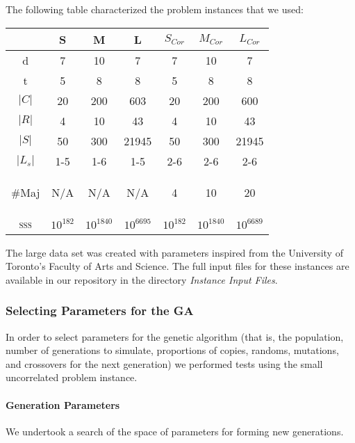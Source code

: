 \documentclass[letterpaper]{article}
\begin{document}
      The following table characterized the problem instances that we used:
      
      \begin{center}
      \begin{small}
      \begin{tabular}{*{7}{c}}
      \hline 
      	& S 	& M 	& L 	& $S_{Cor}$ & $M_{Cor}$ & $L_{Cor}$ \\ 
      \hline \hline
       d 		& 7 	& 10	& 7 	& 7 	& 10 	& 7 	\\ 
       t 		& 5		& 8 	& 8 	& 5 	& 8 	& 8 	\\ 
       $|C|$	& 20 	& 200 	& 603 	& 20 	& 200 	& 600 	\\ 
       $|R|$	& 4 	& 10 	& 43 	& 4 	& 10 	& 43	\\ 
       $|S|$	& 50 	& 300 	& 21945 & 50 	& 300 	& 21945	\\ 
       $|L_s|$	& 1-5 	& 1-6 	& 1-5 	& 2-6 	& 2-6 	& 2-6 	\\ 
       \begin{tiny}$\#$Maj\end{tiny}	& N/A 	& N/A 	& N/A 	& 4 	& 10 	& 20 	\\ 
       \textsc{sss}	& $10^{182}$ & $10^{1840}$ & $10^{6695}$ & $10^{182}$ & $10^{1840}$ & $10^{6689}$ \\
      \hline 
	  \end{tabular} 
	  \end{small}
	  \end{center}
	  
	  The large data set was created with parameters inspired from the University of 
	  Toronto's Faculty of Arts and Science.
	  The full input files for these instances are available in our repository in the 
	  directory \emph{Instance Input Files}.
	  
    \subsubsection{Selecting Parameters for the GA}
      In order to select parameters for the genetic algorithm (that is, the population, 
      number of generations to simulate, proportions of copies, randoms, mutations, and 
      crossovers for the next generation) we performed tests using the small uncorrelated 
      problem instance.
      
      \paragraph{Generation Parameters}
        We undertook a search of the space of parameters for forming new generations. 
\end{document}
